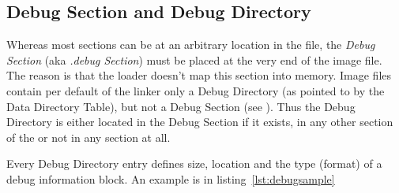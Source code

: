 \subsection*{Debug Section and Debug Directory}

Whereas most sections can be at an arbitrary location in the file, the \emph{Debug Section} (aka \emph{.debug Section}) must be placed at the very end of the image file. The reason is that the loader doesn't map this section into memory. Image files contain per default of the linker only a Debug Directory (as pointed to by the Data Directory Table), but not a Debug Section (see \cite[]{pespec}). Thus the Debug Directory is either located in the Debug Section if it exists, in any other section of the \PE{} or not in any section at all.

Every Debug Directory entry defines \ia{} size, location and the type (format) of a debug information block. An example is in listing~\ref{lst:debugsample}


